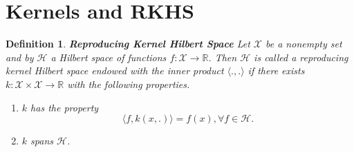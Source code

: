 \documentclass{article}[12pt]
\newtheorem{defn}{Definition}
\begin{document}
\section{Kernels and RKHS}

\begin{defn}{\textbf{Reproducing Kernel Hilbert Space}}
Let $\mathcal X$ be a nonempty set and by $\mathcal H$ a Hilbert space of functions $f: \mathcal X \rightarrow \mathbb R$. Then $\mathcal H$ is called a reproducing kernel Hilbert space endowed with the inner product $\langle.,.\rangle$ if there exists $k: \mathcal X \times \mathcal X \rightarrow \mathbb R$ with the following properties.
\begin{enumerate}
\item $k$ has the property 
\begin{equation}
\langle f, k(x, .) \rangle = f(x), \forall f \in \mathcal H.
\end{equation}
\item $k$ spans $\mathcal H$.
\end{enumerate}
\end{defn}
\end{document}
